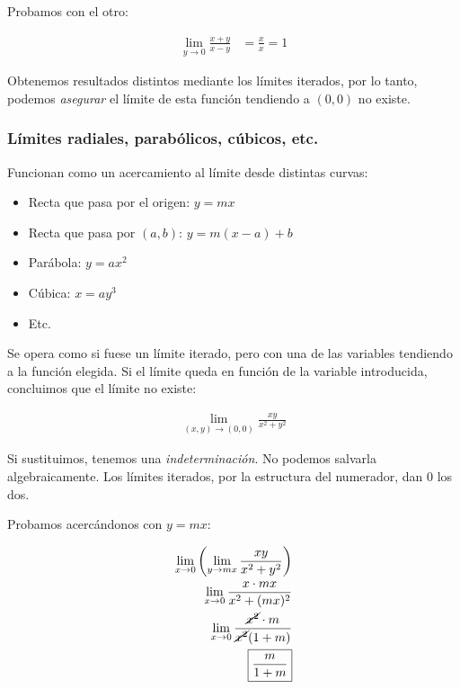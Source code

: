 Probamos con el otro:

\begin{align*}
    \lim_{y \to 0} \frac{x + y}{x - y} & = \frac{x}{x} = \boxed{1}
\end{align*}

Obtenemos resultados distintos mediante los límites iterados,
por lo tanto,
podemos \textit{asegurar} el límite de esta función tendiendo a \((0,0)\)
no existe.

\subsubsection{Límites radiales, parabólicos, cúbicos, etc.}

Funcionan como un acercamiento al límite desde distintas curvas:

\begin{itemize}
    \item Recta que pasa por el origen: \(y = mx\)
    \item Recta que pasa por \((a,b)\): \(y = m(x - a) + b\)
    \item Parábola: \(y = ax^{2}\)
    \item Cúbica: \(x = ay^{3}\)
    \item Etc.
\end{itemize}

Se opera como si fuese un límite iterado,
pero con una de las variables tendiendo a la función elegida.
Si el límite queda en función de la variable introducida,
concluimos que el límite no existe:

\begin{align*}
    \lim_{(x,y) \to (0,0)} \frac{xy}{x^{2} + y^{2}}
\end{align*}

Si sustituimos, tenemos una \textit{indeterminación}.
No podemos salvarla algebraicamente.
Los límites iterados,
por la estructura del numerador,
dan 0 los dos.

Probamos acercándonos con \(y=mx\):

\begin{align*}
    \lim_{x \to 0} \left( \lim_{y \to mx} \frac{xy}{x^{2} + y^{2}} \right) \\
    \lim_{x \to 0} \frac{x \cdot mx}{x^{2} + (mx)^{2}}                     \\
    \lim_{x \to 0} \frac{\cancel{x^{2}}\cdot m}{\cancel{x^{2}} (1 + m)}    \\
    \boxed{\frac{m}{1 + m}}
\end{align*}

